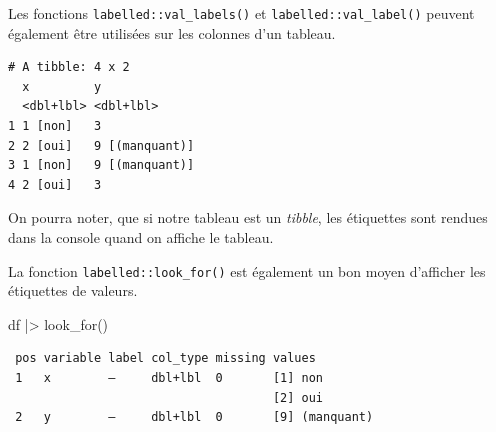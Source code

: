 \documentclass[
  letterpaper,
  DIV=11,
  numbers=noendperiod,
  oneside]{scrreprt}
\newenvironment{Shaded}{\begin{snugshade}}{\end{snugshade}}
\newcommand{\AttributeTok}[1]{\textcolor[rgb]{0.40,0.45,0.13}{#1}}
\newcommand{\DecValTok}[1]{\textcolor[rgb]{0.68,0.00,0.00}{#1}}
\newcommand{\FunctionTok}[1]{\textcolor[rgb]{0.28,0.35,0.67}{#1}}
\newcommand{\NormalTok}[1]{\textcolor[rgb]{0.00,0.23,0.31}{#1}}
\newcommand{\OtherTok}[1]{\textcolor[rgb]{0.00,0.23,0.31}{#1}}
\newcommand{\SpecialCharTok}[1]{\textcolor[rgb]{0.37,0.37,0.37}{#1}}
\newcommand{\StringTok}[1]{\textcolor[rgb]{0.13,0.47,0.30}{#1}}
\begin{document}
Les fonctions \texttt{labelled::val\_labels()} et
\texttt{labelled::val\_label()} peuvent également être utilisées sur les
colonnes d'un tableau.

\begin{Shaded}
\end{Shaded}

\begin{verbatim}
# A tibble: 4 x 2
  x         y             
  <dbl+lbl> <dbl+lbl>     
1 1 [non]   3             
2 2 [oui]   9 [(manquant)]
3 1 [non]   9 [(manquant)]
4 2 [oui]   3             
\end{verbatim}

On pourra noter, que si notre tableau est un \emph{tibble}, les
étiquettes sont rendues dans la console quand on affiche le tableau.

La fonction \texttt{labelled::look\_for()} est également un bon moyen
d'afficher les étiquettes de valeurs.

\begin{Shaded}
\begin{Highlighting}[]
\NormalTok{df }\SpecialCharTok{|\textgreater{}} 
  \FunctionTok{look\_for}\NormalTok{()}
\end{Highlighting}
\end{Shaded}

\begin{verbatim}
 pos variable label col_type missing values        
 1   x        —     dbl+lbl  0       [1] non       
                                     [2] oui       
 2   y        —     dbl+lbl  0       [9] (manquant)
\end{verbatim}
\end{document}
